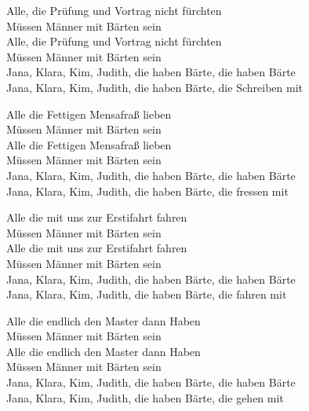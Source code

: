\begin{verseplay}[10em]

\s{\Sing} Alle, die Prüfung und Vortrag nicht fürchten\\
Müssen Männer mit Bärten sein\\
Alle, die Prüfung und Vortrag nicht fürchten\\
Müssen Männer mit Bärten sein\\
\s{\Chor}Jana, Klara, Kim, Judith, die haben Bärte, die haben Bärte\\
Jana, Klara, Kim, Judith, die haben Bärte, die Schreiben mit\\ 
\end{verseplay}
\begin{verseplay}[10em]

\s{\Sing} Alle die Fettigen Mensafraß lieben\\
Müssen Männer mit Bärten sein\\
Alle die Fettigen Mensafraß lieben\\
Müssen Männer mit Bärten sein\\
\s{\Chor}Jana, Klara, Kim, Judith, die haben Bärte, die haben Bärte\\
Jana, Klara, Kim, Judith, die haben Bärte, die fressen mit\\ 
\end{verseplay}
\begin{verseplay}[10em]

\s{\Sing} Alle die mit uns zur Erstifahrt fahren\\
Müssen Männer mit Bärten sein\\
 Alle die mit uns zur Erstifahrt fahren\\
Müssen Männer mit Bärten sein\\
\s{\Chor}Jana, Klara, Kim, Judith, die haben Bärte, die haben Bärte\\
Jana, Klara, Kim, Judith, die haben Bärte, die fahren mit\\ 
\end{verseplay}
\begin{verseplay}[10em]

\s{\Sing} Alle die endlich den Master dann Haben\\
Müssen Männer mit Bärten sein\\
Alle die endlich den Master dann Haben\\
Müssen Männer mit Bärten sein\\
\s{\Chor}Jana, Klara, Kim, Judith, die haben Bärte, die haben Bärte\\
Jana, Klara, Kim, Judith, die haben Bärte, die gehen mit\\ 

\end{verseplay}

